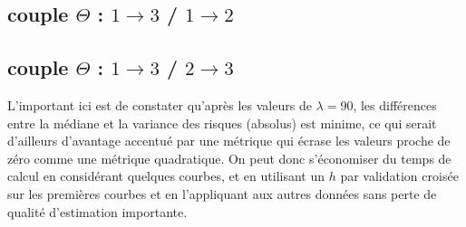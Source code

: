 \pagebreak
\subsection{couple $\Theta$ : $1 \rightarrow 3$ / $1 \rightarrow 2$}


\subsection{couple $\Theta$ : $1 \rightarrow 3$ / $2 \rightarrow 3$}

\bigskip


\begin{leftbar}
	L'important ici est de constater qu'après les valeurs de $\lambda = 90$, les différences entre la médiane et la variance des risques (absolus) est minime, ce qui serait d'ailleurs d'avantage accentué par une métrique qui écrase les valeurs proche de zéro comme une métrique quadratique. On peut donc s'économiser du temps de calcul en considérant quelques courbes, et en utilisant un $h$ par validation croisée sur les premières courbes et en l'appliquant aux autres données sans perte de qualité d'estimation importante.
\end{leftbar}







